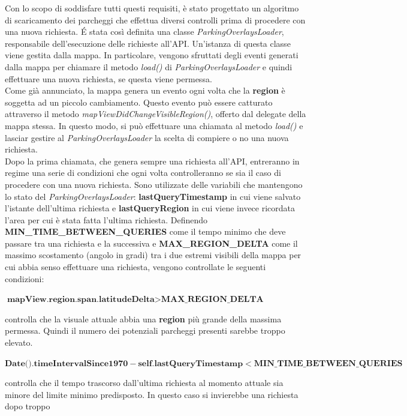Con lo scopo di soddisfare tutti questi requisiti, è stato progettato un algoritmo di 
scaricamento dei parcheggi che effettua diversi controlli prima di procedere con una 
nuova richiesta. \'E stata così definita una classe \emph{ParkingOverlaysLoader}, 
responsabile dell'esecuzione delle richieste all'API. Un'istanza di questa classe
viene gestita dalla mappa. In particolare, vengono sfruttati degli eventi generati
dalla mappa per chiamare il metodo \emph{load()} di \emph{ParkingOverlaysLoader} e
quindi effettuare una nuova richiesta, se questa viene permessa.\\
Come già annunciato, la mappa genera un evento ogni volta che la \textbf{region} è 
soggetta ad un piccolo cambiamento. Questo evento può essere catturato attraverso
il metodo \emph{mapViewDidChangeVisibleRegion()}, offerto dal delegate della mappa
stessa. In questo modo, si può effettuare una chiamata al metodo \emph{load()} e
lasciar gestire al \emph{ParkingOverlaysLoader} la scelta di compiere o no una
nuova richiesta.\\
Dopo la prima chiamata, che genera sempre una richiesta all'API, entreranno in regime
una serie di condizioni che ogni volta controlleranno se sia il caso di procedere con
una nuova richiesta. Sono utilizzate delle variabili che mantengono lo stato del 
\emph{ParkingOverlaysLoader}: \textbf{lastQueryTimestamp} in cui viene salvato 
l'istante dell'ultima richiesta e \textbf{lastQueryRegion} in cui viene invece 
ricordata l'area per cui è stata fatta l'ultima richiesta. Definendo 
\textbf{MIN\_TIME\_BETWEEN\_QUERIES} come il tempo minimo
che deve passare tra una richiesta e la successiva e \textbf{MAX\_REGION\_DELTA} come 
il massimo scostamento (angolo in gradi) tra i due estremi visibili della mappa per 
cui abbia senso effettuare una richiesta, vengono controllate le seguenti condizioni:
\begin{center}
    $ \textbf{mapView.region.span.latitudeDelta} > \textbf{MAX\_REGION\_DELTA} $
\end{center}
controlla che la visuale attuale abbia una \textbf{region} più grande della massima
permessa. Quindi il numero dei potenziali parcheggi presenti sarebbe troppo elevato.
\begin{center}
    $ \textbf{Date().timeIntervalSince1970} - \textbf{self.lastQueryTimestamp} < 
    \textbf{MIN\_TIME\_BETWEEN\_QUERIES} $
\end{center} 
controlla che il tempo trascorso dall'ultima richiesta al momento attuale sia minore 
del limite minimo predisposto. In questo caso si invierebbe una richiesta dopo troppo
